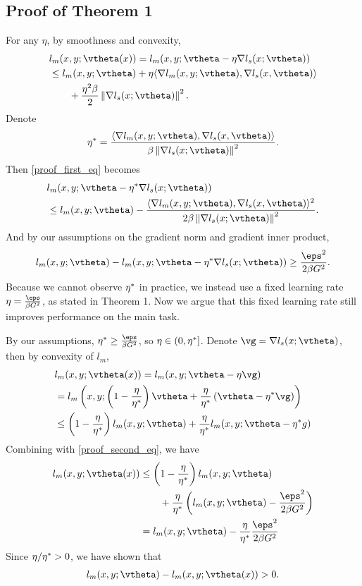 \subsection{Proof of Theorem 1}
\label{main_theorem_proof}
For any $\eta$, by smoothness and convexity,
\begin{align*}
\label{proof_first_eq}
&l_m(x,y; \vtheta(x))
= l_m(x,y; \vtheta - \eta \grad l_s(x; \vtheta))\\
&\leq l_m(x,y; \vtheta) 
+ \eta \langle \grad l_m(x, y; \vtheta), \grad l_s(x, \vtheta) \rangle \\
&\qquad+ \frac{\eta^2\beta}{2} \norm{\grad l_s(x; \vtheta)}^2.
\end{align*}
Denote
$$\eta\opt = \frac{\langle \grad l_m(x, y; \vtheta), \grad l_s(x, \vtheta) \rangle}
{\beta \norm{\grad l_s(x; \vtheta)}^2}.$$ 
Then \autoref{proof_first_eq} becomes
\begin{align}
&l_m(x,y; \vtheta - \eta\opt \grad l_s(x; \vtheta))\\
&\leq l_m(x,y; \vtheta) 
- \frac{\langle \grad l_m(x, y; \vtheta), \grad l_s(x, \vtheta) \rangle^2}
{2\beta \norm{\grad l_s(x; \vtheta)}^2}.
\end{align}
And by our assumptions on the gradient norm 
and gradient inner product,
\begin{align}
\label{proof_second_eq}
l_m(x,y; \vtheta)  - l_m(x,y; \vtheta - \eta\opt \grad l_s(x; \vtheta)) \geq\frac{\eps^2}{2\beta G^2}.
\end{align}
Because we cannot observe $\eta^*$ in practice, we instead use a fixed learning rate $\eta = \frac{\eps}{\beta G^2}$, as stated in Theorem 1.
Now we argue that this fixed learning rate still improves performance on the main task.

By our assumptions, $\eta\opt \geq \frac{\eps}{\beta G^2}$, 
so $\eta \in (0, \eta^*]$.
Denote $\vg = \grad l_s(x; \vtheta)$, then by convexity of $l_m$,
\begin{align}
&l_m(x,y; \vtheta(x))
= l_m(x,y; \vtheta - \eta \vg)\\
&= l_m\paren{x,y; 
	\paren{1 - \frac{\eta}{\eta\opt}} \vtheta +
	\frac{\eta}{\eta\opt} \paren{\vtheta - \eta\opt \vg}} \\
&\leq \paren{1 - \frac{\eta}{\eta\opt}} l_m(x,y; \vtheta) 
+ \frac{\eta}{\eta\opt} l_m(x,y; \vtheta - \eta\opt g)
\end{align}
Combining with \autoref{proof_second_eq}, we have
\begin{align*}
l_m(x,y; \vtheta(x))
&\leq \paren{1 - \frac{\eta}{\eta\opt}} l_m(x,y; \vtheta) \\
&\qquad
+ \frac{\eta}{\eta\opt} \paren{l_m(x,y; \vtheta) - \frac{\eps^2}{2\beta G^2}} \\
&= l_m(x,y; \vtheta) - \frac{\eta}{\eta\opt}\frac{\eps^2}{2\beta G^2}
\end{align*}
Since $\eta / \eta^* > 0$, we have shown that
\begin{align}
l_m(x,y; \vtheta)  - l_m(x,y; \vtheta(x)) > 0.
\end{align}
